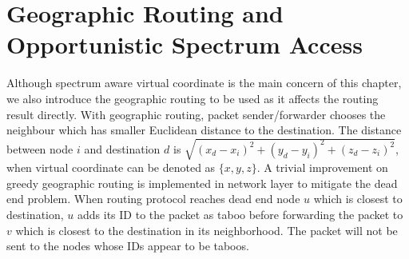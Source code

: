 \section{Geographic Routing and Opportunistic Spectrum Access}
\label{osa}
Although spectrum aware virtual coordinate is the main concern of this chapter, we also introduce the geographic routing to be used as it affects the routing result directly.
With geographic routing, packet sender/forwarder chooses the neighbour which has smaller Euclidean distance to the destination.
The distance between node $i$ and destination $d$ is $\sqrt{(x_d-x_i)^2+(y_d-y_i)^2+(z_d-z_i)^2}$, when virtual coordinate can be denoted as $\{x, y, z\}$.
A trivial improvement on greedy geographic routing is implemented in network layer to mitigate the dead end problem.
When routing protocol reaches dead end node $u$ which is closest to destination, $u$ adds its ID to the packet as taboo before forwarding the packet to $v$ which is closest to the destination in its neighborhood.
The packet will not be sent to the nodes whose IDs appear to be taboos.








